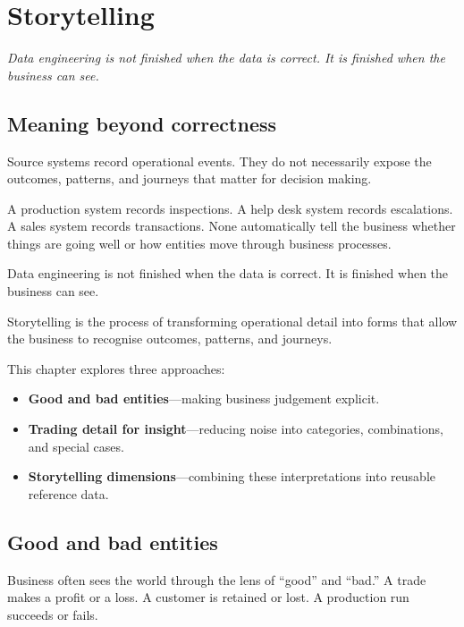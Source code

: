 \documentclass[10pt,openany,10pt]{book}
\providecommand{\tightlist}{%
  \setlength{\itemsep}{0pt}\setlength{\parskip}{0pt}}
\begin{document}
\newpage

\chapter{Storytelling}\label{docs-creating-information-storytelling}

\emph{Data engineering is not finished when the data is correct. It is
finished when the business can see.}

\section{Meaning beyond correctness}\label{meaning-beyond-correctness}

Source systems record operational events. They do not necessarily expose
the outcomes, patterns, and journeys that matter for decision making.

A production system records inspections. A help desk system records
escalations. A sales system records transactions. None automatically
tell the business whether things are going well or how entities move
through business processes.

Data engineering is not finished when the data is correct. It is
finished when the business can see.

Storytelling is the process of transforming operational detail into
forms that allow the business to recognise outcomes, patterns, and
journeys.

This chapter explores three approaches:

\begin{itemize}
\tightlist
\item
  \textbf{Good and bad entities}---making business judgement explicit.
\item
  \textbf{Trading detail for insight}---reducing noise into categories,
  combinations, and special cases.
\item
  \textbf{Storytelling dimensions}---combining these interpretations
  into reusable reference data.
\end{itemize}

\section{Good and bad entities}\label{good-and-bad-entities}

Business often sees the world through the lens of ``good'' and ``bad.''
A trade makes a profit or a loss. A customer is retained or lost. A
production run succeeds or fails.
\end{document}

